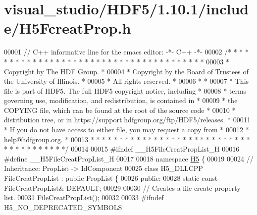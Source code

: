 \hypertarget{visual__studio_2_h_d_f5_21_810_81_2include_2_h5_fcreat_prop_8h_source}{}\section{visual\+\_\+studio/\+H\+D\+F5/1.10.1/include/\+H5\+Fcreat\+Prop.h}
\label{visual__studio_2_h_d_f5_21_810_81_2include_2_h5_fcreat_prop_8h_source}

\begin{DoxyCode}
00001 \textcolor{comment}{// C++ informative line for the emacs editor: -*- C++ -*-}
00002 \textcolor{comment}{/* * * * * * * * * * * * * * * * * * * * * * * * * * * * * * * * * * * * * * *}
00003 \textcolor{comment}{ * Copyright by The HDF Group.                                               *}
00004 \textcolor{comment}{ * Copyright by the Board of Trustees of the University of Illinois.         *}
00005 \textcolor{comment}{ * All rights reserved.                                                      *}
00006 \textcolor{comment}{ *                                                                           *}
00007 \textcolor{comment}{ * This file is part of HDF5.  The full HDF5 copyright notice, including     *}
00008 \textcolor{comment}{ * terms governing use, modification, and redistribution, is contained in    *}
00009 \textcolor{comment}{ * the COPYING file, which can be found at the root of the source code       *}
00010 \textcolor{comment}{ * distribution tree, or in https://support.hdfgroup.org/ftp/HDF5/releases.  *}
00011 \textcolor{comment}{ * If you do not have access to either file, you may request a copy from     *}
00012 \textcolor{comment}{ * help@hdfgroup.org.                                                        *}
00013 \textcolor{comment}{ * * * * * * * * * * * * * * * * * * * * * * * * * * * * * * * * * * * * * * */}
00014 
00015 \textcolor{preprocessor}{#ifndef \_\_H5FileCreatPropList\_H}
00016 \textcolor{preprocessor}{#define \_\_H5FileCreatPropList\_H}
00017 
00018 \textcolor{keyword}{namespace }\hyperlink{namespace_h5}{H5} \{
00019 
00024 \textcolor{comment}{//  Inheritance: PropList -> IdComponent}
00025 \textcolor{keyword}{class }H5\_DLLCPP FileCreatPropList : \textcolor{keyword}{public} PropList \{
00026    \textcolor{keyword}{public}:
00028         \textcolor{keyword}{static} \textcolor{keyword}{const} FileCreatPropList& DEFAULT;
00029 
00030         \textcolor{comment}{// Creates a file create property list.}
00031         FileCreatPropList();
00032 
00033 \textcolor{preprocessor}{#ifndef H5\_NO\_DEPRECATED\_SYMBOLS}

\end{DoxyCode}
